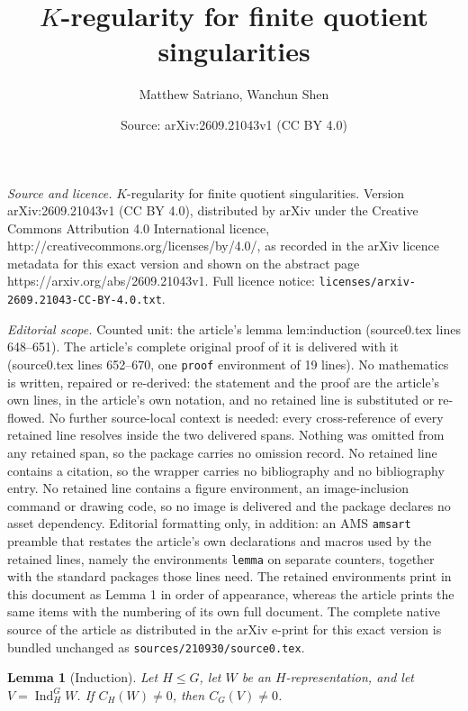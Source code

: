 \documentclass[10pt,a4paper]{amsart}
\title{$K$-regularity for finite quotient singularities}
\author{Matthew Satriano, Wanchun Shen}
\date{Source: arXiv:2609.21043v1 (CC BY 4.0)}
\newtheorem{lemma}{Lemma}
\begin{document}
\maketitle

\noindent\emph{Source and licence.} $K$-regularity for finite quotient singularities. Version arXiv:2609.21043v1 (CC BY 4.0), distributed by arXiv under the Creative Commons Attribution 4.0 International licence, http://creativecommons.org/licenses/by/4.0/, as recorded in the arXiv licence metadata for this exact version and shown on the abstract page https://arxiv.org/abs/2609.21043v1. Full licence notice: \texttt{licenses/arxiv-2609.21043-CC-BY-4.0.txt}.\par\smallskip

\noindent\textit{Editorial scope.} Counted unit: the article's lemma lem:induction (source0.tex lines 648--651). The article's complete original proof of it is delivered with it (source0.tex lines 652--670, one \texttt{proof} environment of 19 lines). No mathematics is written, repaired or re-derived: the statement and the proof are the article's own lines, in the article's own notation, and no retained line is substituted or re-flowed.  No further source-local context is needed: every cross-reference of every retained line resolves inside the two delivered spans.  Nothing was omitted from any retained span, so the package carries no omission record.  No retained line contains a citation, so the wrapper carries no bibliography and no bibliography entry.  No retained line contains a figure environment, an image-inclusion command or drawing code, so no image is delivered and the package declares no asset dependency.  Editorial formatting only, in addition: an AMS \texttt{amsart} preamble that restates the article's own declarations and macros used by the retained lines, namely the environments \texttt{lemma} on separate counters, together with the standard packages those lines need.  The retained environments print in this document as Lemma 1 in order of appearance, whereas the article prints the same items with the numbering of its own full document.  The complete native source of the article as distributed in the arXiv e-print for this exact version is bundled unchanged as \texttt{sources/210930/source0.tex}.
\begin{lemma}[Induction]\label{lem:induction}
Let $H\leq G$, let $W$ be an $H$-representation, and let
$V=\operatorname{Ind}_H^G W$.  If $C_H(W)\neq0$, then $C_G(V)\neq0$.
\end{lemma}
\end{document}
